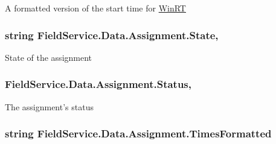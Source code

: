 A formatted version of the start time for \hyperlink{namespace_field_service_1_1_win_r_t}{Win\+R\+T} 

\hypertarget{class_field_service_1_1_data_1_1_assignment_a16eb6a19c1c9fdb1792cff2ad0993120}{
\subsubsection[{State}]{\setlength{\rightskip}{0pt plus 5cm}string Field\+Service.\+Data.\+Assignment.\+State\hspace{0.3cm}{\ttfamily [get]}, {\ttfamily [set]}}}\label{class_field_service_1_1_data_1_1_assignment_a16eb6a19c1c9fdb1792cff2ad0993120}


State of the assignment 

\hypertarget{class_field_service_1_1_data_1_1_assignment_a99aaf68d3cd77b538e8b2e45c0b7b14c}{
\subsubsection[{Status}]{ Field\+Service.\+Data.\+Assignment.\+Status\hspace{0.3cm}{\ttfamily [get]}, {\ttfamily [set]}}}\label{class_field_service_1_1_data_1_1_assignment_a99aaf68d3cd77b538e8b2e45c0b7b14c}


The assignment's status 

\hypertarget{class_field_service_1_1_data_1_1_assignment_a6460a1c1a2263373d55298ff6e66b746}{
\subsubsection[{Times\+Formatted}]{\setlength{\rightskip}{0pt plus 5cm}string Field\+Service.\+Data.\+Assignment.\+Times\+Formatted\hspace{0.3cm}{\ttfamily [get]}}}\label{class_field_service_1_1_data_1_1_assignment_a6460a1c1a2263373d55298ff6e66b746}


